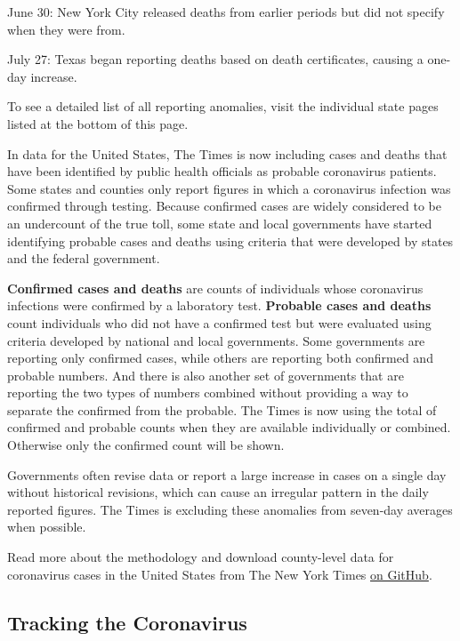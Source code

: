 June 30: New York City released deaths from earlier periods but did not
specify when they were from.

July 27: Texas began reporting deaths based on death certificates,
causing a one-day increase.

To see a detailed list of all reporting anomalies, visit the individual
state pages listed at the bottom of this page.

In data for the United States, The Times is now including cases and
deaths that have been identified by public health officials as probable
coronavirus patients. Some states and counties only report figures in
which a coronavirus infection was confirmed through testing. Because
confirmed cases are widely considered to be an undercount of the true
toll, some state and local governments have started identifying probable
cases and deaths using criteria that were developed by states and the
federal government.

\textbf{Confirmed cases and deaths} are counts of individuals whose
coronavirus infections were confirmed by a laboratory test.
\textbf{Probable cases and deaths} count individuals who did not have a
confirmed test but were evaluated using criteria developed by national
and local governments. Some governments are reporting only confirmed
cases, while others are reporting both confirmed and probable numbers.
And there is also another set of governments that are reporting the two
types of numbers combined without providing a way to separate the
confirmed from the probable. The Times is now using the total of
confirmed and probable counts when they are available individually or
combined. Otherwise only the confirmed count will be shown.

Governments often revise data or report a large increase in cases on a
single day without historical revisions, which can cause an irregular
pattern in the daily reported figures. The Times is excluding these
anomalies from seven-day averages when possible.

Read more about the methodology and download county-level data for
coronavirus cases in the United States from The New York Times
\href{https://github.com/nytimes/covid-19-data}{on GitHub}.

\hypertarget{tracking-the-coronavirus}{%
\subsection{Tracking the Coronavirus}\label{tracking-the-coronavirus}}

